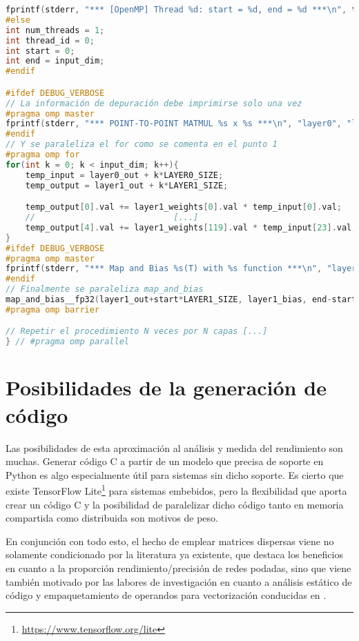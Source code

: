 \begin{enumerate}
\begin{lstlisting}[language=C]
fprintf(stderr, "*** [OpenMP] Thread %d: start = %d, end = %d ***\n", thread_id, start, end);
#else
int num_threads = 1;
int thread_id = 0;
int start = 0;
int end = input_dim;
#endif

#ifdef DEBUG_VERBOSE
// La información de depuración debe imprimirse solo una vez
#pragma omp master
fprintf(stderr, "*** POINT-TO-POINT MATMUL %s x %s ***\n", "layer0", "layer1");
#endif
// Y se paraleliza el for como se comenta en el punto 1
#pragma omp for
for(int k = 0; k < input_dim; k++){
    temp_input = layer0_out + k*LAYER0_SIZE;
    temp_output = layer1_out + k*LAYER1_SIZE;

    temp_output[0].val += layer1_weights[0].val * temp_input[0].val;
    //                            [...]
    temp_output[4].val += layer1_weights[119].val * temp_input[23].val;
}
#ifdef DEBUG_VERBOSE
#pragma omp master
fprintf(stderr, "*** Map and Bias %s(T) with %s function ***\n", "layer1_out", "sigmoid__fp32");
#endif
// Finalmente se paraleliza map_and_bias
map_and_bias__fp32(layer1_out+start*LAYER1_SIZE, layer1_bias, end-start, LAYER1_SIZE, 'N', sigmoid__fp32);
#pragma omp barrier

// Repetir el procedimiento N veces por N capas [...]
} // #pragma omp parallel
\end{lstlisting}
\end{enumerate}

\section{Posibilidades de la generación de código}
\label{sec:posibilidades_de_la_generacion_de_codigo}
Las posibilidades de esta aproximación al análisis y medida del rendimiento son muchas. Generar código C a partir de un modelo que precisa de soporte en Python es algo especialmente útil para sistemas sin dicho soporte. Es cierto que existe TensorFlow Lite\footnote{\url{https://www.tensorflow.org/lite}} para sistemas embebidos, pero la flexibilidad que aporta crear un código C y la posibilidad de paralelizar dicho código tanto en memoria compartida como distribuida son motivos de peso.

En conjunción con todo esto, el hecho de emplear matrices dispersas viene no solamente condicionado por la literatura ya existente, que destaca los beneficios en cuanto a la proporción rendimiento/precisión de redes podadas, sino que viene también motivado por las labores de investigación en cuanto a análisis estático de código y empaquetamiento de operandos para vectorización conducidas en \cite{custom_high_performance_vector_codegen_sparse_computations}.

